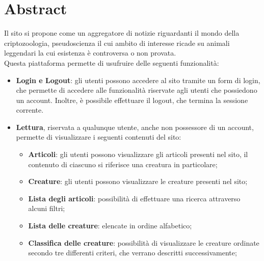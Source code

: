 \section{Abstract}
\label{sec:abstract}

Il sito si propone come un aggregatore di notizie riguardanti il mondo della criptozoologia, pseudoscienza il cui ambito di interesse ricade su animali leggendari la cui esistenza è controversa o non provata. \\
Questa piattaforma permette di usufruire delle seguenti funzionalità:
\begin{itemize}
    \item \textbf{Login e Logout}: gli utenti possono accedere al sito tramite un form di login, che permette di accedere alle funzionalità riservate agli utenti che possiedono un account. Inoltre, è possibile effettuare il logout, che termina la sessione corrente.
    \item \textbf{Lettura}, riservata a qualunque utente, anche non possessore di un account, permette di visualizzare i seguenti contenuti del sito:
    \begin{itemize}
        \item \textbf{Articoli}: gli utenti possono visualizzare gli articoli presenti nel sito, il contenuto di ciascuno si riferisce una creatura in particolare;
        \item \textbf{Creature}: gli utenti possono visualizzare le creature presenti nel sito;
        \item \textbf{Lista degli articoli}: possibilità di effettuare una ricerca attraverso alcuni filtri;
        \item \textbf{Lista delle creature}: elencate in ordine alfabetico;
        \item \textbf{Classifica delle creature}: possibilità di visualizzare le creature ordinate secondo tre differenti criteri, che verrano descritti successivamente;
    \end{itemize}
\end{itemize}